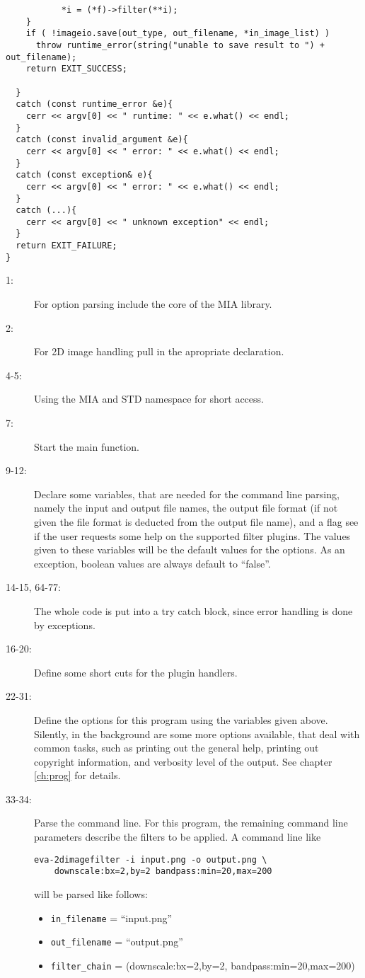 \begin{lstlisting}
           *i = (*f)->filter(**i);
    }
    if ( !imageio.save(out_type, out_filename, *in_image_list) )
      throw runtime_error(string("unable to save result to ") + out_filename);
    return EXIT_SUCCESS; 

  } 
  catch (const runtime_error &e){
    cerr << argv[0] << " runtime: " << e.what() << endl;
  }
  catch (const invalid_argument &e){
    cerr << argv[0] << " error: " << e.what() << endl;
  }
  catch (const exception& e){
    cerr << argv[0] << " error: " << e.what() << endl;
  }
  catch (...){
    cerr << argv[0] << " unknown exception" << endl;
  }
  return EXIT_FAILURE;
}  
\end{lstlisting}  

\begin{description}
\item [1:] For option parsing include the core of the MIA library. 
\item [2:] For 2D image handling pull in the apropriate declaration. 
\item [4-5:] Using the MIA and STD namespace for short access. 
\item [7:] Start the main function. 
\item [9-12:] Declare some variables, that are needed for the command line parsing, namely the input and output file names, 
    the output file format (if not given the file format is deducted from the output file name), and a flag 
    see if the user requests some help on the supported filter plugins. 
    The values given to these variables will be the default values for the options. 
     As an exception, boolean values are always default to ``false''. 
\item [14-15, 64-77:] The whole code is put into a try catch block, since error handling is done by exceptions. 
\item [16-20:] Define some short cuts for the plugin handlers.
\item [22-31:] Define the options for this program using the variables given above. 
    Silently, in the background are some more options available, that deal with common tasks, such as printing out the general
      help, printing out copyright information, and verbosity level of the output. 
    See chapter \ref{ch:prog} for details. 
\item [33-34:] Parse the command line. 
     For this program, the remaining command line parameters describe the filters to be applied. 
    A command line like 
    \lstset{language=bash,numbers=none}
    \begin{lstlisting}
eva-2dimagefilter -i input.png -o output.png \
    downscale:bx=2,by=2 bandpass:min=20,max=200
    \end{lstlisting}
      will be parsed like follows:
      \begin{itemize}
      \item  \texttt{in\_filename} = ``input.png''
      \item  \texttt{out\_filename} = ``output.png''
      \item  \texttt{filter\_chain} = (downscale:bx=2,by=2, bandpass:min=20,max=200)
      \end{itemize}


\end{description}
